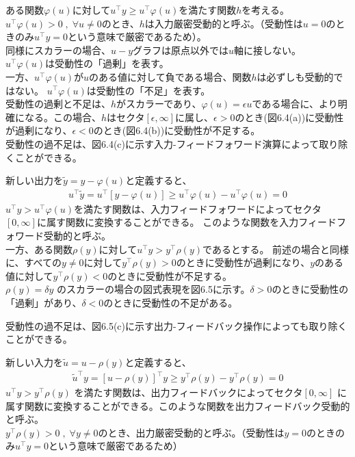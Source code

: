 \documentclass{jsarticle}
\begin{document}
ある関数$\varphi (u)$に対して$u^\top y\geq u^\top \varphi (u)$を満たす関数$h$を考える。\\
$u^\top \varphi (u) > 0\;,\;\forall u\neq 0$のとき、$h$は入力厳密受動的と呼ぶ。（受動性は$u = 0$のときのみ$u^\top y = 0$という意味で厳密であるため）。\\
同様にスカラーの場合、$u-y$グラフは原点以外では$u$軸に接しない。\\
$u^\top \varphi (u)$は受動性の「過剰」を表す。\\
一方、$u^\top \varphi (u)$が$u$のある値に対して負である場合、関数$h$は必ずしも受動的ではない。
$u^\top \varphi (u)$は受動性の「不足」を表す。\\
受動性の過剰と不足は、$h$がスカラーであり、$\varphi (u)=\epsilon u$である場合に、より明確になる。この場合、$h$はセクタ$[\epsilon, \infty]$に属し、$\epsilon > 0$のとき(図6.4(a))に受動性が過剰になり、$\epsilon < 0$のとき(図6.4(b))に受動性が不足する。\\

受動性の過不足は、図6.4(c)に示す入力-フィードフォワード演算によって取り除くことができる。

新しい出力を$\tilde y = y-\varphi (u)$と定義すると、
\begin{align}
  u^\top \tilde y = u^\top [y-\varphi (u)] \geq u^\top \varphi(u)-u^\top \varphi(u) = 0
\end{align}
$u^\top y> u^\top \varphi(u)$を満たす関数は、入力フィードフォワードによってセクタ$[0, \infty]$に属す関数に変換することができる。
このような関数を入力フィードフォワード受動的と呼ぶ。\\
一方、ある関数$\rho(y)$に対して$u^\top y > y^\top \rho(y)$であるとする。
前述の場合と同様に、すべての$y\neq 0$に対して$y^\top \rho(y) > 0$のときに受動性が過剰になり、$y$のある値に対して$y^\top \rho(y) < 0$のときに受動性が不足する。\\
$\rho(y)=\delta y$
のスカラーの場合の図式表現を図6.5に示す。$\delta > 0$のときに受動性の「過剰」があり、$\delta < 0$のときに受動性の不足がある。

受動性の過不足は、図6.5(c)に示す出力-フィードバック操作によっても取り除くことができる。

新しい入力を$\tilde u = u - \rho(y)$と定義すると、
\begin{align}
  \tilde u ^\top y = [u-\rho(y)]^\top y \geq y^\top \rho(y)-y^\top \rho(y)=0
\end{align}
$u^\top y > y^\top \rho(y)$ を満たす関数は、出力フィードバックによってセクタ$[0, \infty]$ に属す関数に変換することができる。このような関数を出力フィードバック受動的と呼ぶ。\\
$y^\top \rho(y) > 0\;,\;\forall y \neq 0$のとき、出力厳密受動的と呼ぶ。（受動性は$y =0$のときのみ$u^\top y = 0$という意味で厳密であるため）
\end{document}

